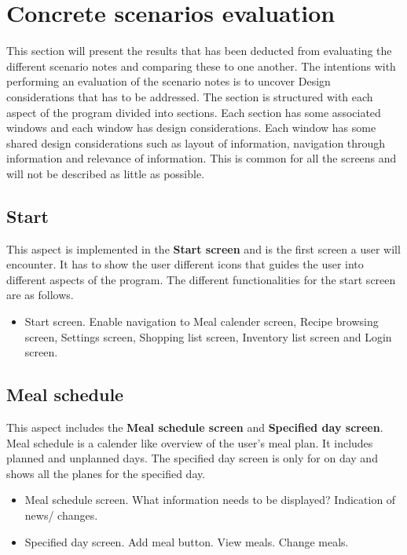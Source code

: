 \section{Concrete scenarios evaluation}
This section will present the results that has been deducted from evaluating the different scenario notes and comparing these to one another. The intentions with performing an evaluation of the scenario notes is to uncover Design considerations that has to be addressed. The section is structured with each aspect of the program divided into sections. Each section has some associated windows and each window has design considerations. Each window has some shared design considerations such as layout of information, navigation through information and relevance of information. This is common for all the screens and will not be described as little as possible.

\subsection{Start}
This aspect is implemented in the \textbf{Start screen} and is the first screen a user will encounter. It has to show the user different icons that guides the user into different aspects of the program. The different functionalities for the start screen are as follows.

\begin{itemize}
	\item Start screen.	
		\subitem Enable navigation to Meal calender screen, Recipe browsing screen, Settings screen, 				Shopping list screen, Inventory list screen and Login screen.
\end{itemize}

\subsection{Meal schedule}
This aspect includes the \textbf{Meal schedule screen} and \textbf{Specified day screen}. Meal schedule is a calender like overview of the user's meal plan. It includes planned and unplanned days. The specified day screen is only for on day and shows all the planes for the specified day.

\begin{itemize}
	\item Meal schedule screen.
		\subitem What information needs to be displayed? 
		\subitem Indication of news/ changes.
	\item Specified day screen.
		\subitem Add meal button.
		\subitem View meals.
		\subitem Change meals.
\end{itemize}

